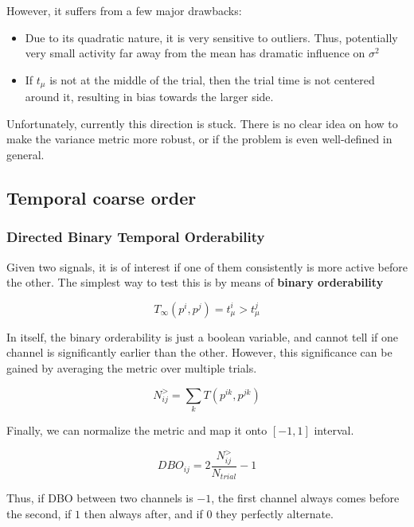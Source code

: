 \documentclass[a4paper,10pt]{article}
\begin{document}
However, it suffers from a few major drawbacks:
\begin{itemize}
    \item Due to its quadratic nature, it is very sensitive to outliers. Thus, 
potentially very small activity far away from the mean has dramatic influence on
$\sigma^2$
    \item If $t_{\mu}$ is not at the middle of the trial, then the trial time is 
not centered around it, resulting in bias towards the larger side.
\end{itemize}

Unfortunately, currently this direction is stuck. There is no clear idea on how 
to make the variance metric more robust, or if the problem is even well-defined 
in general.



\newpage
\subsection{Temporal coarse order}

\subsubsection{Directed Binary Temporal Orderability}

Given two signals, it is of interest if one of them consistently is more active 
before the other. The simplest way to test this is by means of \textbf{binary 
orderability}

\begin{equation}
    T_{\infty}(p^i, p^j) = t_{\mu}^i > t_{\mu}^j
\end{equation}

In itself, the binary orderability is just a boolean variable, and cannot tell 
if one channel is significantly earlier than the other. However, this 
significance can be gained by averaging the metric over multiple trials.

\begin{equation}
    N^{>}_{ij} = \sum_k T(p^{ik}, p^{jk})
\end{equation}

Finally, we can normalize the metric and map it onto $[-1, 1]$ interval.

\begin{equation}
    DBO_{ij} = 2\frac{N^{>}_{ij}}{N_{trial}} - 1
\end{equation}

Thus, if DBO between two channels is $-1$, the first channel always comes 
before the second, if $1$ then always after, and if $0$ they perfectly 
alternate.
\end{document}
